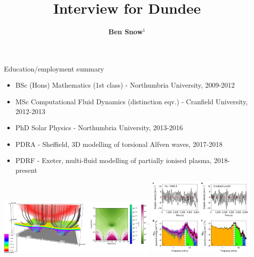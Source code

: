 \documentclass[10pt,aspectratio=169,usenames,dvipsnames]{beamer}
\title{Interview for Dundee}
\date{}
\author{\textbf{Ben Snow$^1$}}
\institute{$^1$University of Exeter \\ August 2023.}
\begin{document}
\maketitle


\begin{frame}{Education/employment summary}
\begin{itemize}
    \item BSc (Hons) Mathematics (1st class) - Northumbria University, 2009-2012
    \item MSc Computational Fluid Dynamics (distinction eqv.) - Cranfield University, 2012-2013
    \item PhD Solar Physics - Northumbria University, 2013-2016
    \item PDRA - Sheffield, 3D modelling of torsional Alfven waves, 2017-2018
    \item PDRF - Exeter, multi-fluid modelling of partially ionised plasma, 2018-present
\end{itemize}
\includegraphics[width=0.59\textwidth]{2023DundeeInterview/Figures/sheffield.jpg}
\includegraphics[width=0.4\textwidth]{2023DundeeInterview/Figures/resonance.png}
\end{frame}
\end{document}
